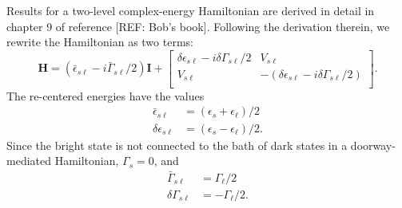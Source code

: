 Results for a two-level complex-energy Hamiltonian are derived in
detail in chapter 9 of reference [REF: Bob's book]. Following the
derivation therein, we rewrite the Hamiltonian as two terms:
\begin{equation}
  \label{eq:complex-zero}
  \mathbf{H} = 
  (\bar{\epsilon}_{s\ell} - i \bar{\Gamma}_{s\ell} / 2) 
  \mathbf{I} +
  \begin{bmatrix}
    \delta \epsilon_{s\ell} - i \delta \Gamma_{s\ell} / 2 & V_{s\ell} \\
    V_{s\ell} & - (\delta \epsilon_{s\ell} - i \delta \Gamma_{s\ell} / 2) \\
  \end{bmatrix}.
\end{equation}
The re-centered energies have the values
\begin{subequations}
  \label{eq:energy-defs}
  \begin{align}
    \bar{\epsilon}_{s\ell} & = (\epsilon_s + \epsilon_{\ell}) / 2 \\
    \delta \epsilon_{s\ell} & = (\epsilon_s - \epsilon_{\ell}) / 2.
  \end{align}
\end{subequations}
Since the bright state is not connected to the bath of dark states in
a doorway-mediated Hamiltonian, $\Gamma_s = 0$, and
\begin{subequations}
  \label{eq:gamma-defs}
  \begin{align}
    \bar{\Gamma}_{s\ell} & = \Gamma_{\ell} / 2 \\
    \delta \Gamma_{s\ell} & = - \Gamma_{\ell} / 2.
  \end{align}
\end{subequations}


